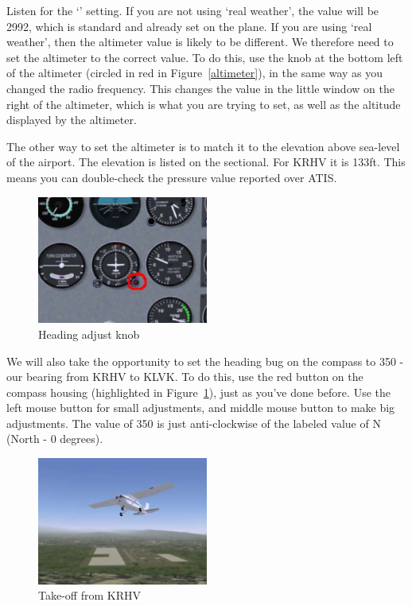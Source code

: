 Listen for the `' setting. If you are not using `real weather',
the value will be 2992, which is standard and already set on the plane.
If you are using `real weather', then the altimeter value is likely to be different.
We therefore need to set the altimeter to the correct value.
To do this, use the knob at the bottom left of the altimeter
(circled in red in Figure~\ref{altimeter}), in the same way as
you changed the radio frequency. This changes the value in the
little window on the right of the altimeter, which is what you are
trying to set, as well as the altitude displayed by the altimeter.

The other way to set the altimeter is to match it to the elevation above
sea-level of the airport. The elevation is listed on the sectional.
For KRHV it is 133ft. This means you can double-check the pressure value reported over ATIS.

\begin{figure}[!htp]
\centering
\includegraphics[width=0.5\textwidth]{compass}
\caption{Heading adjust knob\label{head}}
\end{figure}

We will also take the opportunity to set the heading bug on the compass to 350 -
our bearing from KRHV to KLVK. To do this, use the red button on the compass
housing (highlighted in Figure~\ref{head}), just as you've done before.
Use the left mouse button for small adjustments, and middle mouse button
to make big adjustments. The value of 350 is just anti-clockwise of the
labeled value of N (North - 0 degrees).

\begin{figure}[!htp]
\centering
\includegraphics[width=0.5\textwidth]{takeoff}
\caption{Take-off from KRHV}
\end{figure}

